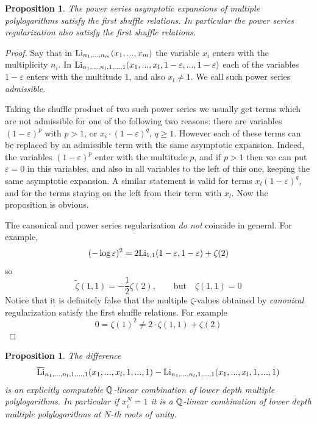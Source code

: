 \documentclass[10pt]{article}
\newtheorem{proposition}[theorem]{Proposition}
\begin{document}
\begin{proposition} \label{olmnq}
The power series asymptotic expansions of multiple polylogarithms satisfy the first shuffle relations. 
In particular the power series regularization also satisfy the first shuffle relations.
\end{proposition}

\begin{proof} 
Say that in ${\rm Li}_{n_1,...,n_m}(x_1,...,x_m)$ the variable $x_i$ enters with the 
multiplicity  $n_i$. 
In ${\rm Li}_{n_1,...,n_l,1, ...,1}(x_1,...,x_l, 1- \varepsilon, ... , 1- \varepsilon)$ 
each of the variables $1- \varepsilon$ enters with the multitude  $1$, and also $x_l \not = 1$. 
We call such power series {\it admissible}. 

Taking the shuffle product of two such power series we usually get terms which are not admissible 
for one of the following two reasons: there are variables 
$(1- \varepsilon)^p$ with $ p>1$, or $x_i \cdot (1- \varepsilon)^q$, $q\geq 1$. 
However each of these terms can be replaced by an admissible term with the same 
asymptotic expansion. Indeed, 
the variables  $(1- \varepsilon)^p$ enter with the multitude  $p$, and if $p>1$ then we can put $\varepsilon = 0$ in this variables, and also in all variables to the left of this one, keeping the same asymptotic expansion. A similar statement is valid for terms $x_l(1- \varepsilon)^q$, and for the terms staying on the left from their term with $x_l$. Now the proposition is obvious. 


The canonical and power series regularization {\it do not} coincide in general.
For example,
$$
(-\log \varepsilon)^2 = 2 {\rm Li}_{1,1}(1-\varepsilon, 1- \varepsilon) + \zeta (2)
$$
so 
$$
\widetilde \zeta (1,1) = - \frac{1}{2}\zeta (2), \qquad \mbox{but} \quad \zeta (1,1) = 0
$$
Notice that it is definitely false that the multiple $\zeta$-values obtained 
 by {\it canonical} regularization satisfy the first shuffle  relations. For example
$$
0 = \zeta(1)^2 \not = 2\cdot \zeta(1,1) + \zeta(2) 
$$


\end{proof}

\begin{proposition} \label{olmn3}
 The difference
$$
{\overline {\rm {\rm Li}}}_{n_1,...,n_l, 1 , ... , 1}(x_1, ... , x_l,1, ... , 1) - 
{\rm Li}_{n_1,...,n_l, 1 , ... , 1}(x_1, ... , x_l,1, ... , 1) 
$$
is an explicitly computable  ${\mathbb Q}$-linear combination of lower depth multiple polylogarithms. In particular if $x_i^N=1$ it is a ${\mathbb Q}$-linear combination of lower depth multiple polylogarithms at $N$-th roots of unity. 
\end{proposition}
\end{document}
